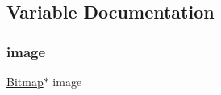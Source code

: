 \subsection{Variable Documentation}
\mbox{\label{group__credits_ga801bef0ab9d72c95bc5d6d6a0d8f2db0}} 
\subsubsection{\texorpdfstring{image}{image}}
{\footnotesize\ttfamily \mbox{\hyperlink{struct_bitmap}{Bitmap}}$\ast$ image}

